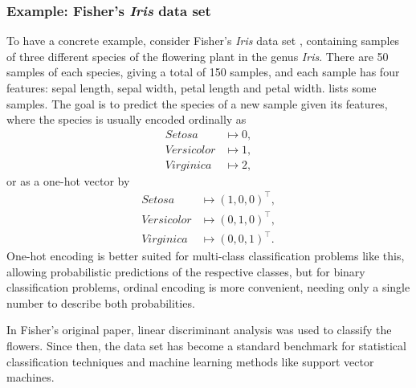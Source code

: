 \subsubsection{Example: Fisher's \textit{Iris} data set}
\label{sec:iris}
To have a concrete example, consider Fisher's \textit{Iris} data set \cite{fisher1936}, containing samples of three different species of the flowering plant in the genus \textit{Iris}.
There are 50 samples of each species, giving a total of 150 samples, and each sample has four features: sepal length, sepal width, petal length and petal width.
 lists some samples.
The goal is to predict the species of a new sample given its features, where the species is usually encoded ordinally as
\begin{equation}
    \label{eq:iris_encoding}
    \begin{split}
        \textit{Setosa} &\mapsto 0,\\
        \textit{Versicolor} &\mapsto 1,\\
        \textit{Virginica} &\mapsto 2,
    \end{split}
\end{equation}
or as a one-hot vector by
\begin{equation}
    \label{eq:iris_one_hot}
    \begin{split}
        \textit{Setosa} &\mapsto (1, 0, 0)^\top,\\
        \textit{Versicolor} &\mapsto (0, 1, 0)^\top,\\
        \textit{Virginica} &\mapsto (0, 0, 1)^\top.
    \end{split}
\end{equation}
One-hot encoding is better suited for multi-class classification problems like this, allowing probabilistic predictions of the respective classes, but for binary classification problems, ordinal encoding is more convenient, needing only a single number to describe both probabilities.


In Fisher's original paper, linear discriminant analysis was used to classify the flowers.
Since then, the data set has become a standard benchmark for statistical classification techniques and machine learning methods like support vector machines.


